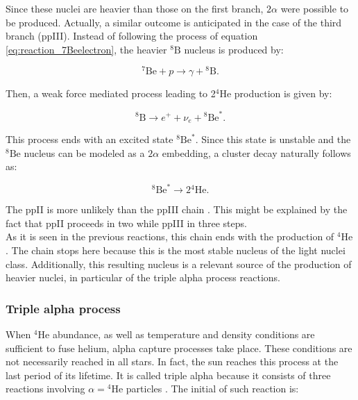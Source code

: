 \documentclass[openany]{book}
\begin{document}
Since these nuclei are heavier than those on the first branch, $2\alpha$ were possible to be produced. Actually, a similar outcome is anticipated in the case of the third branch (ppIII). Instead of following the process of equation \ref{eq:reaction_7Beelectron}, the heavier $\mathrm{{}^{8}B}$ nucleus is produced by:

\begin{equation}  \label{eq:reaction_7Bep}
		{}^{7}\mathrm{Be}  + p \rightarrow \gamma +  \mathrm{{}^{8}B} .
\end{equation}

Then, a weak force mediated process leading to 2$\mathrm{{}^4He}$ production is given by: 

\begin{equation} \label{eq:reaction_8Bpositron}
	{}^{8}\mathrm{B} \rightarrow e^{+} + \nu_e + 	{}^{8}\mathrm{{Be}^{*}}.
\end{equation}

This process ends with an excited state ${}^{8}\mathrm{{Be}^{*}}$. Since this state is unstable and the $\mathrm{{}^{8}Be}$ nucleus can be modeled as a $2\alpha$ embedding, a cluster decay naturally follows as: 

\begin{equation} \label{eq:reaction_8Bdisintegration}
	{}^{8}\mathrm{{Be}^{*}} \rightarrow 2{}^{4}\mathrm{He}.
\end{equation}

The ppII is more unlikely than the ppIII chain \cite{bertulani_2010}. This might be explained by the fact that ppII proceeds in two  while ppIII in three steps. \\

As it is seen in the previous reactions, this chain ends with the production of $\mathrm{{}^{4}He}$. The chain stops here because this is the most stable nucleus of the light nuclei class. Additionally, this resulting nucleus is a relevant source of the production of heavier nuclei, in particular of the triple alpha process reactions. \\

\subsubsection{Triple alpha process}

When $\mathrm{{}^{4}He}$ abundance, as well as temperature and density conditions are sufficient to fuse helium, alpha capture processes take place. These conditions are not necessarily reached in all stars. In fact, the sun reaches this process at the last period of its lifetime. It is called triple alpha because it consists of three reactions involving $\alpha = \mathrm{{}^{4}He}$ particles \cite{coc_2012}. The initial of such reaction is:
\end{document}
